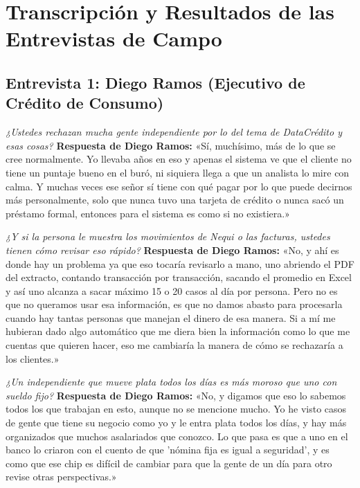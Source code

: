 \documentclass[11pt,a4paper]{article}
\begin{document}
\section{Transcripción y Resultados de las Entrevistas de Campo}

\subsection{Entrevista 1: Diego Ramos (Ejecutivo de Crédito de Consumo)}

\begin{tcolorbox}[colback=lightgray,colframe=primary,title=\textbf{Pregunta 1: Rechazo de independientes por historial en buró}]
\textit{¿Ustedes rechazan mucha gente independiente por lo del tema de DataCrédito y esas cosas?}
\tcblower
\textbf{Respuesta de Diego Ramos:}  
«Sí, muchísimo, más de lo que se cree normalmente. Yo llevaba años en eso y apenas el sistema ve que el cliente no tiene un puntaje bueno en el buró, ni siquiera llega a que un analista lo mire con calma. Y muchas veces ese señor sí tiene con qué pagar por lo que puede decirnos más personalmente, solo que nunca tuvo una tarjeta de crédito o nunca sacó un préstamo formal, entonces para el sistema es como si no existiera.»
\end{tcolorbox}

\begin{tcolorbox}[colback=lightgray,colframe=primary,title=\textbf{Pregunta 2: Capacidad de procesamiento manual de extractos digitales}]
\textit{¿Y si la persona le muestra los movimientos de Nequi o las facturas, ustedes tienen cómo revisar eso rápido?}
\tcblower
\textbf{Respuesta de Diego Ramos:}  
«No, y ahí es donde hay un problema ya que eso tocaría revisarlo a mano, uno abriendo el PDF del extracto, contando transacción por transacción, sacando el promedio en Excel y así uno alcanza a sacar máximo 15 o 20 casos al día por persona. Pero no es que no queramos usar esa información, es que no damos abasto para procesarla cuando hay tantas personas que manejan el dinero de esa manera. Si a mí me hubieran dado algo automático que me diera bien la información como lo que me cuentas que quieren hacer, eso me cambiaría la manera de cómo se rechazaría a los clientes.»
\end{tcolorbox}

\begin{tcolorbox}[colback=lightgray,colframe=primary,title=\textbf{Pregunta 3: Comportamiento de pago de independientes vs. asalariados}]
\textit{¿Un independiente que mueve plata todos los días es más moroso que uno con sueldo fijo?}
\tcblower
\textbf{Respuesta de Diego Ramos:}  
«No, y digamos que eso lo sabemos todos los que trabajan en esto, aunque no se mencione mucho. Yo he visto casos de gente que tiene su negocio como yo y le entra plata todos los días, y hay más organizados que muchos asalariados que conozco. Lo que pasa es que a uno en el banco lo criaron con el cuento de que 'nómina fija es igual a seguridad', y es como que ese chip es difícil de cambiar para que la gente de un día para otro revise otras perspectivas.»
\end{tcolorbox}
\end{document}
